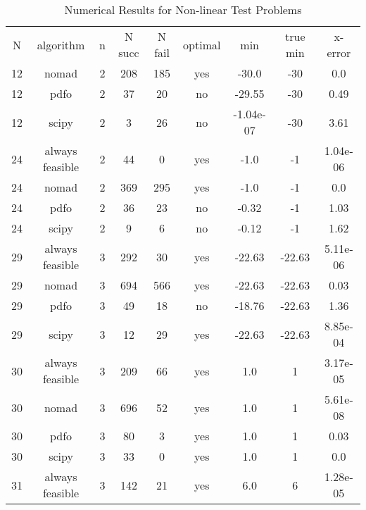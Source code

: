 
\begin{scriptsize}
\begin{center}
\begin{longtable}{ccccccccc}
\caption{Numerical Results for Non-linear Test Problems} \\
\label{nonlinear_results}  
  N &       algorithm &  n & N succ & N fail & optimal &         min &    true min &  x-error\\
 12 &           nomad &  2 &    208 &    185 &     yes &       -30.0 &         -30 &      0.0\\
 12 &            pdfo &  2 &     37 &     20 &      no &      -29.55 &         -30 &     0.49\\
 12 &           scipy &  2 &      3 &     26 &      no &   -1.04e-07 &         -30 &     3.61\\
 24 & always feasible &  2 &     44 &      0 &     yes &        -1.0 &          -1 & 1.04e-06\\
 24 &           nomad &  2 &    369 &    295 &     yes &        -1.0 &          -1 &      0.0\\
 24 &            pdfo &  2 &     36 &     23 &      no &       -0.32 &          -1 &     1.03\\
 24 &           scipy &  2 &      9 &      6 &      no &       -0.12 &          -1 &     1.62\\
 29 & always feasible &  3 &    292 &     30 &     yes &      -22.63 &      -22.63 & 5.11e-06\\
 29 &           nomad &  3 &    694 &    566 &     yes &      -22.63 &      -22.63 &     0.03\\
 29 &            pdfo &  3 &     49 &     18 &      no &      -18.76 &      -22.63 &     1.36\\
 29 &           scipy &  3 &     12 &     29 &     yes &      -22.63 &      -22.63 & 8.85e-04\\
 30 & always feasible &  3 &    209 &     66 &     yes &         1.0 &           1 & 3.17e-05\\
 30 &           nomad &  3 &    696 &     52 &     yes &         1.0 &           1 & 5.61e-08\\
 30 &            pdfo &  3 &     80 &      3 &     yes &         1.0 &           1 &     0.03\\
 30 &           scipy &  3 &     33 &      0 &     yes &         1.0 &           1 &      0.0\\
 31 & always feasible &  3 &    142 &     21 &     yes &         6.0 &           6 & 1.28e-05\\

\end{longtable}
\end{center}
\end{scriptsize}
